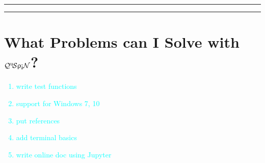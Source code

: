 \documentclass{SciPost}
\newcommand\0{\scalebox{-1}[1]{0}}
\newcommand{\qspin}{$\mathcal{Q}^{\mathrm{u}}\!\mathcal{S}\uprho\mathrm{\text{\textexclamdown}}\mathcal{N}$}
\newcommand*{\cyan}{\textcolor{cyan}}
\begin{document}
\vspace{10pt}
\noindent\rule{\textwidth}{1pt}
\tableofcontents\thispagestyle{fancy}
\noindent\rule{\textwidth}{1pt}
\vspace{10pt}


\section{What Problems can I Solve with \qspin?}
\label{sec:intro}

\cyan{
	\begin{enumerate}
		\item write test functions
		\item support for Windows 7, 10
		\item put references
		\item add terminal basics
		\item write online doc using Jupyter
	\end{enumerate}
	}
\end{document}
